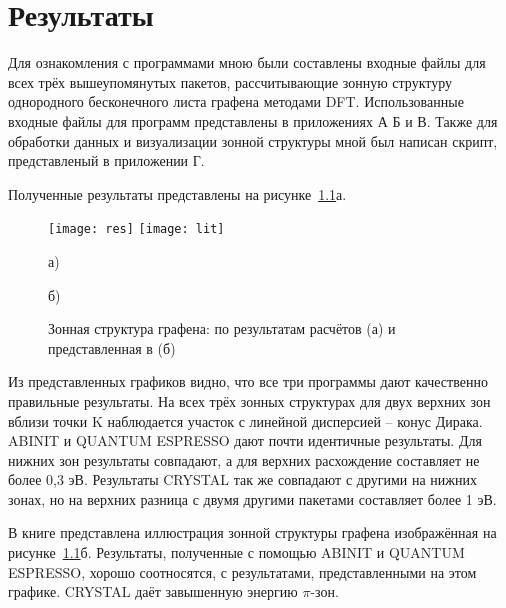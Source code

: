 \chapter{Результаты}
 
 Для ознакомления с программами мною были составлены входные файлы для всех трёх вышеупомянутых пакетов, рассчитывающие зонную структуру однородного бесконечного листа графена методами DFT. Использованные входные файлы для программ представлены в приложениях А Б и В. Также для обработки данных и визуализации зонной структуры мной был написан скрипт, представленый в приложении Г.

 Полученные результаты представлены на рисунке~\ref{bands}а.
\begin{figure}[h]
    \center
    \texttt{[image: res]}\hfill
    \texttt{[image: lit]}
    \parbox[t]{.47\textwidth}{\center а)}\hfill
    \parbox[t]{.47\textwidth}{\center б)}
    \caption{Зонная структура графена: по результатам расчётов (а) и представленная в \cite{graphene} (б)}
    \label{bands}
\end{figure}
 Из представленных графиков видно, что все три программы дают качественно правильные результаты. На всех трёх зонных структурах для двух верхних зон вблизи точки K наблюдается участок с линейной дисперсией -- конус Дирака. ABINIT и QUANTUM ESPRESSO дают почти идентичные результаты. Для нижних зон результаты совпадают, а для верхних расхождение составляет не более 0,3 эВ. Результаты CRYSTAL так же совпадают с другими на нижних зонах, но на верхних разница с двумя другими пакетами составляет более 1 эВ.

 В книге \cite{graphene} представлена иллюстрация зонной структуры графена изображённая на рисунке~\ref{bands}б. Результаты, полученные с помощью ABINIT и QUANTUM ESPRESSO, хорошо соотносятся, с результатами, представленными на этом графике. CRYSTAL даёт завышенную энергию \( \pi \)-зон.